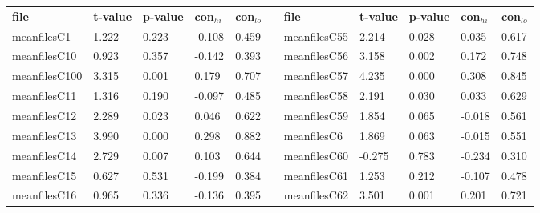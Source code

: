 \begin{table}[h!]
\small
\begin{tabular}{lllllllllll}
\textbf{file} & \textbf{t-value} & \textbf{p-value} & \textbf{con$_{hi}$} & \textbf{con$_{lo}$} & \textbf{} & \textbf{file} & \textbf{t-value} & \textbf{p-value} & \textbf{con$_{hi}$} & \textbf{con$_{lo}$} \\ \cline{1-5} \cline{7-11} 
meanfilesC1   & 1.222            & 0.223            & -0.108              & 0.459               &           & meanfilesC55  & 2.214            & 0.028            & 0.035               & 0.617               \\
meanfilesC10  & 0.923            & 0.357            & -0.142              & 0.393               &           & meanfilesC56  & 3.158            & 0.002            & 0.172               & 0.748               \\
meanfilesC100 & 3.315            & 0.001            & 0.179               & 0.707               &           & meanfilesC57  & 4.235            & 0.000            & 0.308               & 0.845               \\
meanfilesC11  & 1.316            & 0.190            & -0.097              & 0.485               &           & meanfilesC58  & 2.191            & 0.030            & 0.033               & 0.629               \\
meanfilesC12  & 2.289            & 0.023            & 0.046               & 0.622               &           & meanfilesC59  & 1.854            & 0.065            & -0.018              & 0.561               \\
meanfilesC13  & 3.990            & 0.000            & 0.298               & 0.882               &           & meanfilesC6   & 1.869            & 0.063            & -0.015              & 0.551               \\
meanfilesC14  & 2.729            & 0.007            & 0.103               & 0.644               &           & meanfilesC60  & -0.275           & 0.783            & -0.234              & 0.310               \\
meanfilesC15  & 0.627            & 0.531            & -0.199              & 0.384               &           & meanfilesC61  & 1.253            & 0.212            & -0.107              & 0.478               \\
meanfilesC16  & 0.965            & 0.336            & -0.136              & 0.395               &           & meanfilesC62  & 3.501            & 0.001            & 0.201               & 0.721               \\

\end{tabular}
\end{table}
